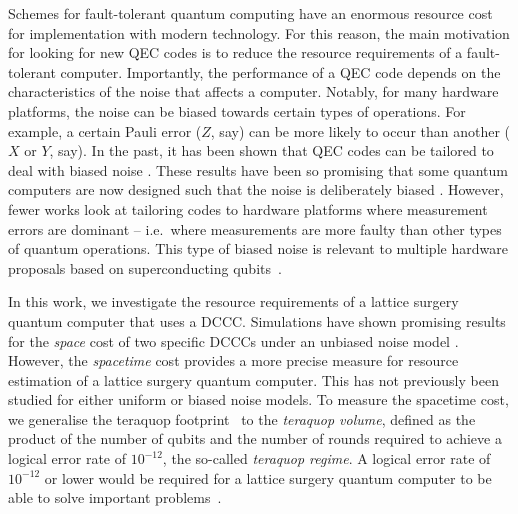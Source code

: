 Schemes for fault-tolerant quantum computing have an enormous resource cost for implementation with modern technology.
For this reason, the main motivation for looking for new QEC codes is to reduce the resource requirements of a fault-tolerant computer. Importantly, the performance of a QEC code depends on the characteristics of the noise that affects a computer. 
Notably, for many hardware platforms, the noise can be biased towards certain types of operations.
For example, a certain Pauli error ($Z$, say) can be more likely to occur than another ($X$ or $Y$, say).
In the past, it has been shown that QEC codes can be tailored to deal with biased noise
\cite{bonilla2021xzzx, darmawan2021practical, OscarSubsystemGaugeFixing, Miguel2023cellularautomaton, Srivastava2022xyzhexagonal, NonIID, PhysRevLett.133.110601,Tuckett2018,Tuckett2019, Tuckett2020}.
These results have been so promising that some quantum computers are now designed such that the noise is
deliberately biased \cite{darmawan2021practical}.
However, fewer works look at tailoring codes 
to hardware platforms where measurement errors are dominant --
i.e.\ where measurements are more faulty than other types of quantum operations.
This type of biased noise is relevant to multiple hardware proposals based on superconducting qubits~\cite{harper2025characterising, rigetti_qpus, iqm_radiance}.


In this work, we investigate the resource requirements of a lattice surgery quantum computer that uses a DCCC.
Simulations have shown promising results for the \textit{space} cost of two specific DCCCs under an unbiased noise model \cite{gidney2021fault, gidney2022benchmarking, kesselring2022anyon}.
However, the \textit{spacetime} cost provides a more precise measure for resource estimation of a lattice surgery quantum computer. This has not previously been studied for either uniform or biased noise models.
To measure the spacetime cost, we generalise the teraquop footprint~\cite{gidney2021fault} to the \textit{teraquop volume}, defined as the product of the number of qubits and the number of rounds required to achieve a logical error rate of $10^{-12}$, the so-called \textit{teraquop regime}.
A logical error rate of $10^{-12}$ or lower would be required for a lattice surgery quantum computer to be able to solve important problems~\cite{lee2021even, gidney2021factor, haner2020improved,gidney2025factor,bourdoncle2026two}.

